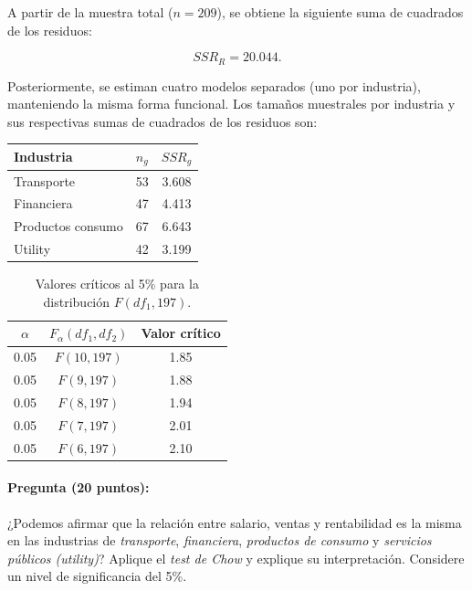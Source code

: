 \documentclass[10pt,a4paper]{article}
\begin{document}
\begin{enumerate}
A partir de la muestra total ($n = 209$), se obtiene la siguiente suma de cuadrados de los residuos:

\[
SSR_R = 20.044.
\]

Posteriormente, se estiman cuatro modelos separados (uno por industria), manteniendo la misma 
forma funcional. Los tamaños muestrales por industria y sus respectivas sumas de cuadrados de los 
residuos son:

\begin{center}
\begin{tabular}{lcc}
\toprule
\textbf{Industria} & $n_g$ & $SSR_g$ \\
\midrule
Transporte        & 53 & 3.608 \\
Financiera        & 47 & 4.413 \\
Productos consumo & 67 & 6.643 \\
Utility           & 42 & 3.199 \\

\bottomrule
\end{tabular}
\end{center}

\vspace{0.5cm}

\begin{table}[h!]
\centering
\begin{tabular}{ccc}
\hline
$\alpha$ & $F_{\alpha}(df_1, df_2)$ & Valor crítico \\ \hline
0.05 & $F(10,197)$ & 1.85 \\
0.05 & $F(9,197)$  & 1.88 \\
0.05 & $F(8,197)$  & 1.94 \\
0.05 & $F(7,197)$  & 2.01 \\
0.05 & $F(6,197)$  & 2.10 \\ \hline
\end{tabular}
\caption{Valores críticos al 5\% para la distribución $F(df_1,197)$.}
\end{table}

\paragraph{Pregunta (20 puntos):}
¿Podemos afirmar que la relación entre salario, ventas y rentabilidad es la misma en las 
industrias de \textit{transporte}, \textit{financiera}, \textit{productos de consumo} y 
\textit{servicios públicos (utility)}? 
Aplique el \textit{test de Chow} y explique 
su interpretación. Considere un nivel de significancia del 5\%.


\end{enumerate}
\end{document}
